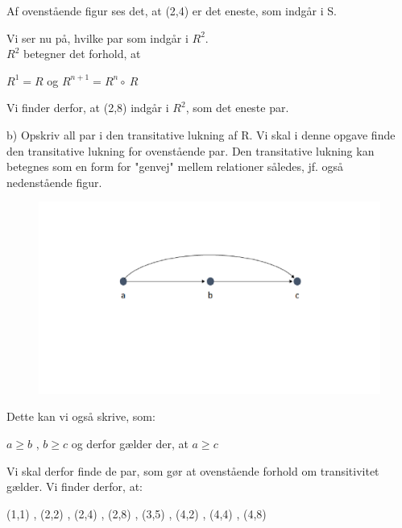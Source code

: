 \documentclass{article}
\begin{document}
Af ovenstående figur ses det, at (2,4) er det eneste, som indgår i S. 

Vi ser nu på, hvilke par som indgår i $R^2$.\\
$R^2$ betegner det forhold, at 

\begin{center}
    
    $R^1 = R$ og $R^{n+1} = R^n \circ\ R$
    
\end{center}

Vi finder derfor, at (2,8) indgår i $R^2$, som det eneste par.


b) Opskriv all par i den transitative lukning af R.
Vi skal i denne opgave finde den transitative lukning for ovenstående par. Den transitative lukning kan betegnes som en form for "genvej" mellem relationer således, jf. også nedenstående figur.


\begin{figure}[h]
\begin{center}
\includegraphics[scale=0.9]{ABC}
\end{center}
\end{figure}

Dette kan vi også skrive, som:

\begin{center}
    $a \geq b$ , $ b \geq c $ og derfor gælder der, at $ a \geq c$
\end{center}

Vi skal derfor finde de par, som gør at ovenstående forhold om transitivitet gælder. Vi finder derfor, at:

\begin{center}
     (1,1) , (2,2) , (2,4) , (2,8) , (3,5) , (4,2) , (4,4)  , (4,8)
\end{center} 
\end{document}
